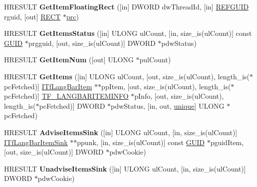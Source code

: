\begin{DoxyCompactItemize}
\mbox{\label{interface_i_tf_lang_bar_item_mgr_ad0ee745d680251259ba843de19427608}} 
H\+R\+E\+S\+U\+LT {\bfseries Get\+Item\+Floating\+Rect} (\mbox{[}in\mbox{]} D\+W\+O\+RD dw\+Thread\+Id, \mbox{[}in\mbox{]} \hyperlink{struct___g_u_i_d}{R\+E\+F\+G\+U\+ID} rguid, \mbox{[}out\mbox{]} \hyperlink{structtag_r_e_c_t}{R\+E\+CT} $\ast$\hyperlink{structtag_r_e_c_t}{prc})
\item 
\mbox{\label{interface_i_tf_lang_bar_item_mgr_aae540aa909117db455f0020b1823402a}} 
H\+R\+E\+S\+U\+LT {\bfseries Get\+Items\+Status} (\mbox{[}in\mbox{]} U\+L\+O\+NG ul\+Count, \mbox{[}in, size\+\_\+is(ul\+Count)\mbox{]} const \hyperlink{interface_g_u_i_d}{G\+U\+ID} $\ast$prgguid, \mbox{[}out, size\+\_\+is(ul\+Count)\mbox{]} D\+W\+O\+RD $\ast$pdw\+Status)
\item 
\mbox{\label{interface_i_tf_lang_bar_item_mgr_afb6db38d3b24d7ae29fa5bf3f1c6f835}} 
H\+R\+E\+S\+U\+LT {\bfseries Get\+Item\+Num} (\mbox{[}out\mbox{]} U\+L\+O\+NG $\ast$pul\+Count)
\item 
\mbox{\label{interface_i_tf_lang_bar_item_mgr_ad473e86cce766ea02629c01407021e63}} 
H\+R\+E\+S\+U\+LT {\bfseries Get\+Items} (\mbox{[}in\mbox{]} U\+L\+O\+NG ul\+Count, \mbox{[}out, size\+\_\+is(ul\+Count), length\+\_\+is($\ast$pc\+Fetched)\mbox{]} \hyperlink{interface_i_tf_lang_bar_item}{I\+Tf\+Lang\+Bar\+Item} $\ast$$\ast$pp\+Item, \mbox{[}out, size\+\_\+is(ul\+Count), length\+\_\+is($\ast$pc\+Fetched)\mbox{]} \hyperlink{struct_t_f___l_a_n_g_b_a_r_i_t_e_m_i_n_f_o}{T\+F\+\_\+\+L\+A\+N\+G\+B\+A\+R\+I\+T\+E\+M\+I\+N\+FO} $\ast$p\+Info, \mbox{[}out, size\+\_\+is(ul\+Count), length\+\_\+is($\ast$pc\+Fetched)\mbox{]} D\+W\+O\+RD $\ast$pdw\+Status, \mbox{[}in, out, \hyperlink{interfaceunique}{unique}\mbox{]} U\+L\+O\+NG $\ast$pc\+Fetched)
\item 
\mbox{\label{interface_i_tf_lang_bar_item_mgr_a8e36c791527b1961be6fb933682ae13a}} 
H\+R\+E\+S\+U\+LT {\bfseries Advise\+Items\+Sink} (\mbox{[}in\mbox{]} U\+L\+O\+NG ul\+Count, \mbox{[}in, size\+\_\+is(ul\+Count)\mbox{]} \hyperlink{interface_i_tf_lang_bar_item_sink}{I\+Tf\+Lang\+Bar\+Item\+Sink} $\ast$$\ast$ppunk, \mbox{[}in, size\+\_\+is(ul\+Count)\mbox{]} const \hyperlink{interface_g_u_i_d}{G\+U\+ID} $\ast$pguid\+Item, \mbox{[}out, size\+\_\+is(ul\+Count)\mbox{]} D\+W\+O\+RD $\ast$pdw\+Cookie)
\item 
\mbox{\label{interface_i_tf_lang_bar_item_mgr_a37a5f3d8b77fe55b3a5ec0ad366dfe37}} 
H\+R\+E\+S\+U\+LT {\bfseries Unadvise\+Items\+Sink} (\mbox{[}in\mbox{]} U\+L\+O\+NG ul\+Count, \mbox{[}in, size\+\_\+is(ul\+Count)\mbox{]} D\+W\+O\+RD $\ast$pdw\+Cookie)
\end{DoxyCompactItemize}
